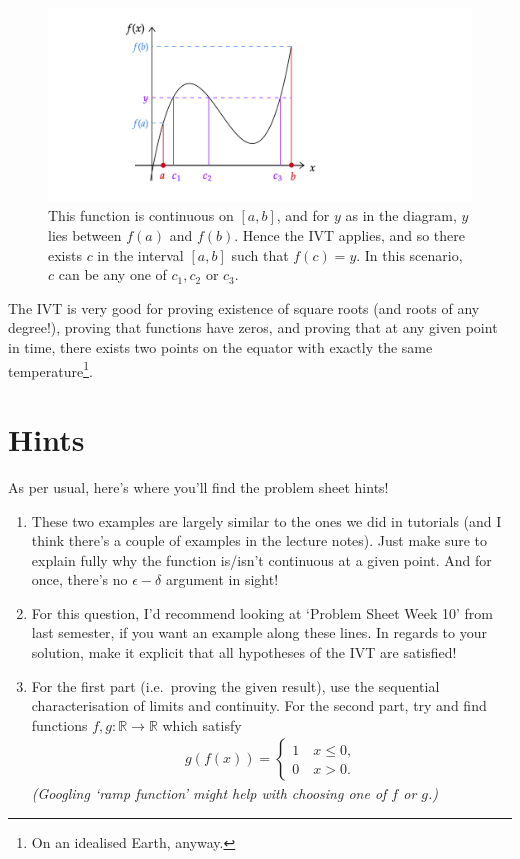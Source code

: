 \documentclass[
  17pt,
  a4paper]{extarticle}
\providecommand{\tightlist}{%
  \setlength{\itemsep}{0pt}\setlength{\parskip}{0pt}}
\theoremstyle{plain}
\theoremstyle{definition}
\theoremstyle{plain}
\theoremstyle{plain}
\theoremstyle{plain}
\theoremstyle{plain}
\theoremstyle{definition}
\theoremstyle{definition}
\theoremstyle{remark}
\theoremstyle{remark}
\renewcommand{\;}{\,}
\begin{document}
\begin{figure}
\includegraphics[width=\Width,height=\Height]{ivt} \caption{This function is continuous on $[a,b]$, and for $y$ as in the diagram, $y$ lies between $f(a)$ and $f(b)$. Hence the IVT applies, and so there exists $c$ in the interval $[a,b]$ such that $f(c)=y$. In this scenario, $c$ can be any one of $c_1,c_2$ or $c_3$.}\label{fig:ivt}
\end{figure}

The IVT is very good for proving existence of square roots (and roots of any degree!), proving that functions have zeros, and proving that at any given point in time, there exists two points on the equator with exactly the same temperature\footnote{On an idealised Earth, anyway.}.

\hypertarget{hints}{%
\section{Hints}\label{hints}}

As per usual, here's where you'll find the problem sheet hints!

\begin{enumerate}
\def\labelenumi{\arabic{enumi})}
\tightlist
\item
  These two examples are largely similar to the ones we did in tutorials (and I think there's a couple of examples in the lecture notes). Just make sure to explain fully why the function is/isn't continuous at a given point. And for once, there's no \(\epsilon-\delta\) argument in sight!
\item
  For this question, I'd recommend looking at `Problem Sheet Week 10' from last semester, if you want an example along these lines. In regards to your solution, make it explicit that all hypotheses of the IVT are satisfied!
\item
  For the first part (i.e.~proving the given result), use the sequential characterisation of limits and continuity. For the second part, try and find functions \(f,g: \mathbb{R} \to \mathbb{R}\) which satisfy
  \begin{align*}
  g(f(x)) = \begin{cases}
  1 \quad x\leq 0,\\
  0 \quad x > 0.
  \end{cases}
  \end{align*}
  \emph{(Googling `ramp function' might help with choosing one of \(f\) or \(g\).)}
\end{enumerate}
\end{document}
